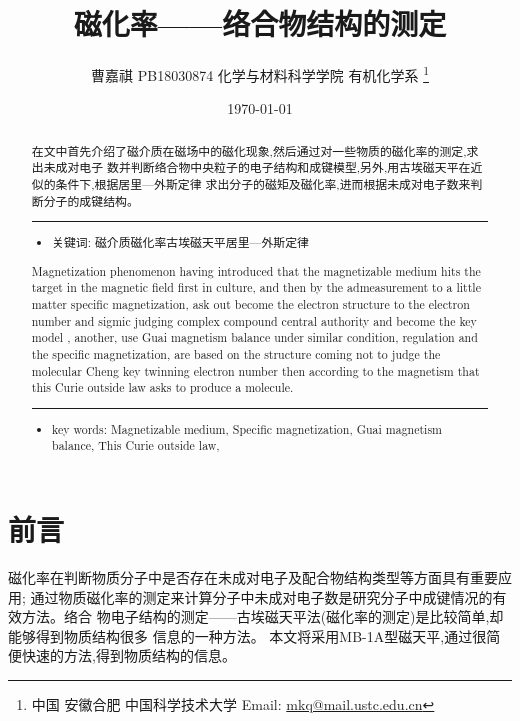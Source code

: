 \documentclass[11pt]{report}
\author{曹嘉祺 PB18030874 化学与材料科学学院 有机化学系 \thanks{中国 安徽合肥 中国科学技术大学 Email: \href{mailto:mkq@mail.ustc.edu.cn}{mkq@mail.ustc.edu.cn}}}
\date{\today}
\title{磁化率——络合物结构的测定}
\begin{document}
\maketitle
\tableofcontents

\begin{abstract}
在文中首先介绍了磁介质在磁场中的磁化现象,然后通过对一些物质的磁化率的测定,求出未成对电子
数并判断络合物中央粒子的电子结构和成键模型,另外,用古埃磁天平在近似的条件下,根据居里—外斯定律
求出分子的磁矩及磁化率,进而根据未成对电子数来判断分子的成键结构。

\noindent\rule{\textwidth}{0.5pt}
\begin{itemize}
\item 关键词: 磁介质\quad 磁化率\quad 古埃磁天平\quad 居里—外斯定律
\end{itemize}
\end{abstract}




\begin{abstract}
Magnetization phenomenon having introduced that the magnetizable medium hits the
target in the magnetic field first in culture, and then by the admeasurement to a little matter
specific magnetization, ask out become the electron structure to the electron number and sigmic
judging complex compound central authority and become the key model , another, use Guai
magnetism balance under similar condition, regulation and the specific magnetization, are based
on the structure coming not to judge the molecular Cheng key twinning electron number then
according to the magnetism that this Curie outside law asks to produce a molecule.

\noindent\rule{\textwidth}{0.5pt}

\begin{itemize}
\item key words:  Magnetizable medium, Specific magnetization, Guai magnetism balance, This Curie outside law,
\end{itemize}
\end{abstract}
\part{前言}
\label{sec:orgda20aa6}
磁化率在判断物质分子中是否存在未成对电子及配合物结构类型等方面具有重要应用;
通过物质磁化率的测定来计算分子中未成对电子数是研究分子中成键情况的有效方法。络合
物电子结构的测定——古埃磁天平法(磁化率的测定)是比较简单,却能够得到物质结构很多
信息的一种方法。
本文将采用MB-1A型磁天平,通过很简便快速的方法,得到物质结构的信息。
\end{document}

